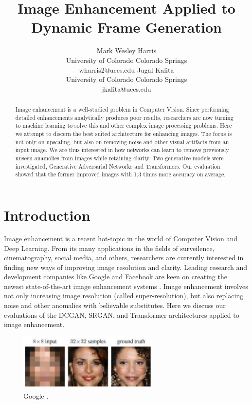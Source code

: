 \documentclass[letterpaper]{article} %
\title{Image Enhancement Applied to Dynamic Frame Generation}
\author{Mark Wesley Harris\\ %
University of Colorado Colorado Springs\\
wharris2@uccs.edu %
\And
Jugal Kalita\\
University of Colorado Colorado Springs\\
jkalita@uccs.edu
}
\begin{document}
\maketitle

\begin{abstract}
Image enhancement is
a well-studied problem in Computer Vision.
Since performing detailed enhancements analytically produces poor results,
researchers are now turning to machine learning to solve
this and other complex image processing problems.
Here we attempt to discern the best suited architecture for enhancing images.
The focus is not only on upscaling, but also on removing noise and other visual artifacts from an input image.
We are thus interested in how networks can learn to remove previously unseen anamolies from images
while retaining clarity.
Two generative models were investigated,
Generative Adversarial Networks and Transformers.
Our evaluation showed that the former improved images with 1.3 times more accuracy on average.
\end{abstract}

\section{Introduction}
Image enhancement is a recent hot-topic in the world of Computer Vision
and Deep Learning. From its many applications in the
fields of surveilence, cinematography, social media, and others,
researchers are currently interested
in finding new ways of improving image resolution and clarity.
Leading research and development companies like Google and Facebook are keen on creating the newest
state-of-the-art image enhancement systems \cite{google}.
Image enhancement involves not only increasing image resolution
(called super-resolution), but also replacing noise and other anomalies with
believable substitutes.
Here we discuss our evaluations of
the DCGAN, SRGAN, and Transformer architectures
applied to image enhancement.

\begin{figure}[htbp]
\centerline{\includegraphics[width=7cm]{google.png}}
\caption{Google \cite{google}.}
\label{fig:google}
\end{figure}
\end{document}
